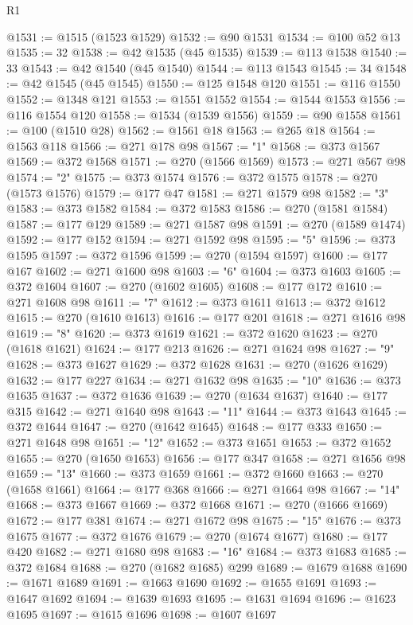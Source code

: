 \begin{lexlean}{R1}
\begin{coremodule}
@1531 := @1515 (@1523 @1529)
@1532 := @90 @1531
@1534 := @100 @52 @13
@1535 := 32
@1538 := @42 @1535 (@45 @1535)
@1539 := @113 @1538
@1540 := 33
@1543 := @42 @1540 (@45 @1540)
@1544 := @113 @1543
@1545 := 34
@1548 := @42 @1545 (@45 @1545)
@1550 := @125 @1548 @120
@1551 := @116 @1550
@1552 := @1348 @121
@1553 := @1551 @1552
@1554 := @1544 @1553
@1556 := @116 @1554 @120
@1558 := @1534 (@1539 @1556)
@1559 := @90 @1558
@1561 := @100 (@1510 @28)
@1562 := @1561 @18
@1563 := @265 @18
@1564 := @1563 @118
@1566 := @271 @178 @98
@1567 := "1"
@1568 := @373 @1567
@1569 := @372 @1568
@1571 := @270 (@1566 @1569)
@1573 := @271 @567 @98
@1574 := "2"
@1575 := @373 @1574
@1576 := @372 @1575
@1578 := @270 (@1573 @1576)
@1579 := @177 @47
@1581 := @271 @1579 @98
@1582 := "3"
@1583 := @373 @1582
@1584 := @372 @1583
@1586 := @270 (@1581 @1584)
@1587 := @177 @129
@1589 := @271 @1587 @98
@1591 := @270 (@1589 @1474)
@1592 := @177 @152
@1594 := @271 @1592 @98
@1595 := "5"
@1596 := @373 @1595
@1597 := @372 @1596
@1599 := @270 (@1594 @1597)
@1600 := @177 @167
@1602 := @271 @1600 @98
@1603 := "6"
@1604 := @373 @1603
@1605 := @372 @1604
@1607 := @270 (@1602 @1605)
@1608 := @177 @172
@1610 := @271 @1608 @98
@1611 := "7"
@1612 := @373 @1611
@1613 := @372 @1612
@1615 := @270 (@1610 @1613)
@1616 := @177 @201
@1618 := @271 @1616 @98
@1619 := "8"
@1620 := @373 @1619
@1621 := @372 @1620
@1623 := @270 (@1618 @1621)
@1624 := @177 @213
@1626 := @271 @1624 @98
@1627 := "9"
@1628 := @373 @1627
@1629 := @372 @1628
@1631 := @270 (@1626 @1629)
@1632 := @177 @227
@1634 := @271 @1632 @98
@1635 := "10"
@1636 := @373 @1635
@1637 := @372 @1636
@1639 := @270 (@1634 @1637)
@1640 := @177 @315
@1642 := @271 @1640 @98
@1643 := "11"
@1644 := @373 @1643
@1645 := @372 @1644
@1647 := @270 (@1642 @1645)
@1648 := @177 @333
@1650 := @271 @1648 @98
@1651 := "12"
@1652 := @373 @1651
@1653 := @372 @1652
@1655 := @270 (@1650 @1653)
@1656 := @177 @347
@1658 := @271 @1656 @98
@1659 := "13"
@1660 := @373 @1659
@1661 := @372 @1660
@1663 := @270 (@1658 @1661)
@1664 := @177 @368
@1666 := @271 @1664 @98
@1667 := "14"
@1668 := @373 @1667
@1669 := @372 @1668
@1671 := @270 (@1666 @1669)
@1672 := @177 @381
@1674 := @271 @1672 @98
@1675 := "15"
@1676 := @373 @1675
@1677 := @372 @1676
@1679 := @270 (@1674 @1677)
@1680 := @177 @420
@1682 := @271 @1680 @98
@1683 := "16"
@1684 := @373 @1683
@1685 := @372 @1684
@1688 := @270 (@1682 @1685) @299
@1689 := @1679 @1688
@1690 := @1671 @1689
@1691 := @1663 @1690
@1692 := @1655 @1691
@1693 := @1647 @1692
@1694 := @1639 @1693
@1695 := @1631 @1694
@1696 := @1623 @1695
@1697 := @1615 @1696
@1698 := @1607 @1697

\end{coremodule}
\end{lexlean}
